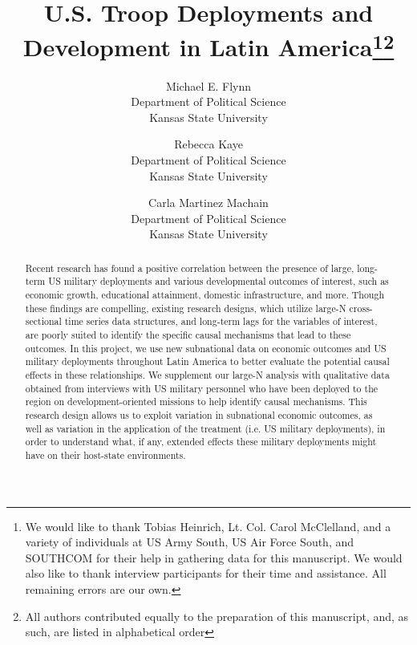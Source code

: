 \documentclass[12pt]{article}
\begin{document}
\title{U.S. Troop Deployments and Development in Latin America\thanks{We would like to thank Tobias Heinrich, Lt. Col. Carol McClelland, and a variety of individuals at US Army South, US Air Force South, and SOUTHCOM for their help in gathering data for this manuscript. We would also like to thank interview participants for their time and assistance. All remaining errors are our own.}\footnote{All authors contributed equally to the preparation of this manuscript, and, as such, are listed in alphabetical order}}
\author{Michael E. Flynn \\
Department of Political Science  \\
Kansas State University
\and
Rebecca Kaye \\
Department of Political Science \\
Kansas State University
\and
Carla Martinez Machain \\
Department of Political Science \\
Kansas State University
}
\date{}

\maketitle

\vfill
\begin{abstract}
\noindent  Recent research has found a positive correlation between the presence of large, long-term US military deployments and various developmental outcomes of interest, such as economic growth, educational attainment, domestic infrastructure, and more. Though these findings are compelling, existing research designs, which utilize large-N cross-sectional time series data structures, and long-term lags for the variables of interest, are poorly suited to identify the specific causal mechanisms that lead to these outcomes. In this project, we use new subnational data on economic outcomes and US military deployments throughout Latin America to better evaluate the potential causal effects in these relationships. We supplement our large-N analysis with qualitative data obtained from interviews with US military personnel who have been deployed to the region on development-oriented missions to help identify causal mechanisms. This research design allows us to exploit variation in subnational economic outcomes, as well as variation in the application of the treatment (i.e. US military deployments), in order to understand what, if any, extended effects these military deployments might have on their host-state environments. 
\end{abstract}
\vfill
\thispagestyle{empty}
\clearpage
\end{document}
